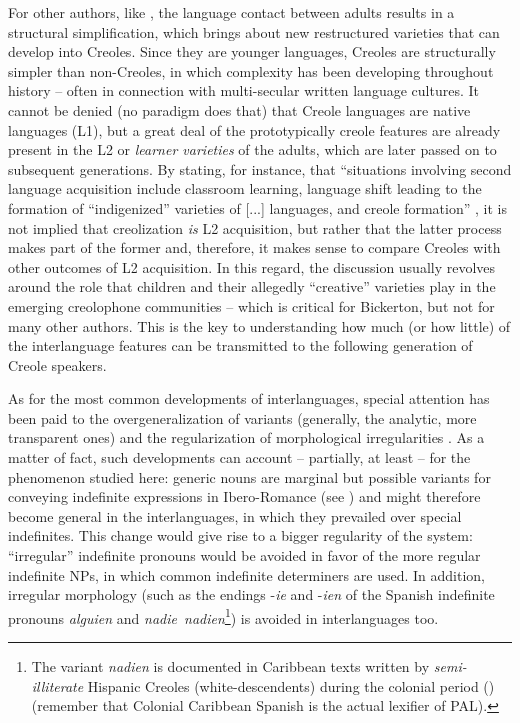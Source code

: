 \documentclass[output=paper,colorlinks,citecolor=brown]{langscibook}
\begin{document}
For other authors, like \citet{McWhorter2011}, the language contact between adults results in a structural simplification, which brings about new restructured varieties that can develop into Creoles. Since they are younger languages, Creoles are structurally simpler than non-Creoles, in which complexity has been developing throughout history -- often in connection with multi-secular written language cultures. It cannot be denied (no paradigm does that) that Creole languages are native languages (L1), but a great deal of the prototypically creole features are already present in the L2 or \textit{learner varieties} of the adults, which are later passed on to subsequent generations. By stating, for instance, that “situations involving second language acquisition include classroom learning, language shift leading to the formation of “indigenized” varieties of [...] languages, and creole formation” \citep[][127]{Winford2008}, it is not implied that creolization \textit{is} L2 acquisition, but rather that the latter process makes part of the former and, therefore, it makes sense to compare Creoles with other outcomes of L2 acquisition. In this regard, the discussion usually revolves around the role that children and their allegedly “creative” varieties play in the emerging creolophone communities -- which is critical for Bickerton, but not for many other authors. This is the key to understanding how much (or how little) of the interlanguage features can be transmitted to the following generation of Creole speakers.

\begin{sloppypar}
As for the most common developments of interlanguages, special attention has been paid to the overgeneralization of variants (generally, the analytic, more transparent ones) and the regularization of morphological irregularities \citep{McWhorter2011, Selinker1972}. As a matter of fact, such developments can account -- partially, at least -- for the phenomenon studied here: generic nouns are marginal but possible variants for conveying indefinite expressions in Ibero\hyp Romance (see ) and might therefore become general in the interlanguages, in which they prevailed over special indefinites. This change would give rise to a bigger regularity of the system: “irregular” indefinite pronouns would be avoided in favor of the more regular indefinite NPs, in which common indefinite determiners are used. In addition, irregular morphology (such as the endings -\textit{ie} and -\textit{ien} of the Spanish indefinite pronouns \textit{alguien} and \textit{nadie~nadien}\footnote{The variant \textit{nadien} is documented in Caribbean texts written by \textit{semi-illiterate} Hispanic Creoles (white-descendents) during the colonial period (\citealt[][546, 548, 589]{GutiérrezMaté2018}) (remember that Colonial Caribbean Spanish is the actual lexifier of PAL).}) is avoided in interlanguages too.
\end{sloppypar}
\end{document}
